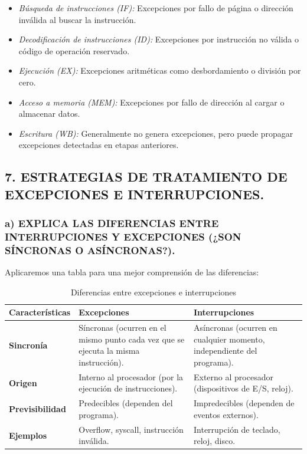 \documentclass[12pt]{article}
\begin{document}
\begin{itemize}
    \item \textit{Búsqueda de instrucciones (IF):} Excepciones por fallo de página o dirección inválida al buscar la instrucción.
    \item \textit{Decodificación de instrucciones (ID):} Excepciones por instrucción no válida o código de operación reservado.
    \item \textit{Ejecución (EX):} Excepciones aritméticas como desbordamiento o división por cero.
    \item \textit{Acceso a memoria (MEM):} Excepciones por fallo de dirección al cargar o almacenar datos.
    \item \textit{Escritura (WB):} Generalmente no genera excepciones, pero puede propagar excepciones detectadas en etapas anteriores.
\end{itemize}

\subsection*{7. ESTRATEGIAS DE TRATAMIENTO DE EXCEPCIONES E INTERRUPCIONES.}

\subsubsection*{a) EXPLICA LAS DIFERENCIAS ENTRE INTERRUPCIONES Y EXCEPCIONES (¿SON SÍNCRONAS O ASÍNCRONAS?).}

Aplicaremos una tabla para una mejor comprensión de las diferencias:

\begin{table}[h]
\centering
\begin{tabular}{p{3.5cm}p{5cm}p{5cm}}
\toprule
\textbf{Características} & \textbf{Excepciones} & \textbf{Interrupciones} \\
\midrule
\textbf{Sincronía} & Síncronas (ocurren en el mismo punto cada vez que se ejecuta la misma instrucción). & Asíncronas (ocurren en cualquier momento, independiente del programa). \\
\midrule
\textbf{Origen} & Interno al procesador (por la ejecución de instrucciones). & Externo al procesador (dispositivos de E/S, reloj). \\
\midrule
\textbf{Previsibilidad} & Predecibles (dependen del programa). & Impredecibles (dependen de eventos externos). \\
\midrule
\textbf{Ejemplos} & Overflow, syscall, instrucción inválida. & Interrupción de teclado, reloj, disco. \\
\bottomrule
\end{tabular}
\caption{Diferencias entre excepciones e interrupciones}
\label{tab:excepciones-vs-interrupciones}
\end{table}
\end{document}
